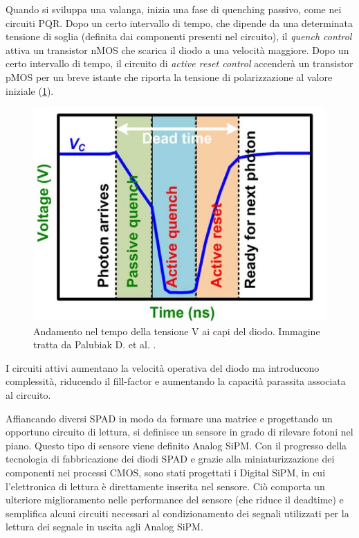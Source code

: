 Quando si sviluppa una valanga, inizia una fase di quenching passivo, come nei circuiti PQR. Dopo un certo intervallo di tempo, che dipende da una determinata tensione di soglia (definita dai componenti presenti nel circuito), il \textit{quench control} attiva un transistor nMOS che scarica il diodo a una velocità maggiore. Dopo un certo intervallo di tempo, il circuito di \textit{active reset control} accenderà un transistor pMOS per un breve istante che riporta la tensione di polarizzazione al valore iniziale (\Fig\ref{fig:aqr_2}).
\begin{figure}[tbh]
	\centering
	\includegraphics[width=0.5\linewidth]{./ImageFiles/aqr_2.jpg}
	\caption{Andamento nel tempo della tensione V ai capi del diodo. Immagine tratta da Palubiak D. et al. \cite{Palubiak2011}.}
	\label{fig:aqr_2}
\end{figure} 
I circuiti attivi aumentano la velocità operativa del diodo ma introducono complessità, riducendo il fill-factor e aumentando la capacità parassita associata al circuito.
\newpage

Affiancando diversi SPAD in modo da formare una matrice e progettando un opportuno circuito di lettura, si definisce un sensore in grado di rilevare fotoni nel piano. Questo tipo di sensore viene definito Analog SiPM. Con il progresso della tecnologia di fabbricazione dei diodi SPAD e grazie alla miniaturizzazione dei componenti nei processi CMOS, sono stati progettati i Digital SiPM, in cui l'elettronica di lettura è direttamente inserita nel sensore. Ciò comporta un ulteriore miglioramento nelle performance del sensore (che riduce il deadtime) e semplifica alcuni circuiti necessari al condizionamento dei segnali utilizzati per la lettura dei segnale in uscita agli Analog SiPM.

\clearpage
